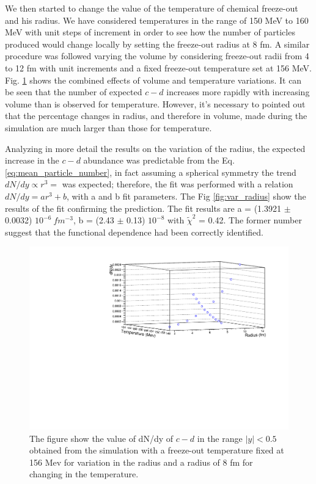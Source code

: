 \documentclass[12pt,a4paper]{book}
\begin{document}
	We then started to change the value of the temperature of chemical freeze-out and his radius. We have considered temperatures in the range of 150 MeV to 160 MeV with unit steps of increment in order to see how the number of particles produced would change locally by setting the freeze-out radius at 8 fm. A similar procedure was followed varying the volume by considering freeze-out radii from 4 to 12 fm with unit increments and a fixed freeze-out temperature set at 156 MeV. Fig. \ref{fig:2dgraph} shows the combined effects of volume and temperature variations. It can be seen that the number of expected $c-d$ increases more rapidly with increasing volume than is observed for temperature. However, it's necessary to pointed out that the percentage changes in radius, and therefore in volume, made during the simulation are much larger than those for temperature.
	
  Analyzing in more detail the results on the variation of the radius, the expected increase in the $c-d$ abundance  was predictable from the Eq. \ref{eq:mean_particle_number}, in fact assuming a spherical symmetry the trend $dN/dy \propto r^3 = $ was expected; therefore, the fit was performed with a relation $dN/dy =a r^3 +b$, with a and b fit parameters. The Fig \ref{fig:var_radius} show the results of the fit confirming the prediction. The fit results are  a = (1.3921 $\pm$ 0.0032) $10^{-6} \ fm^{-3}$, b = (2.43 $\pm$ 0.13) $10^{-8}$ with $\tilde{\chi}^2$ = 0.42. The former number suggest that the functional dependence had been correctly identified.   
	\begin{figure}
		\centering
			\includegraphics[width=0.7 \linewidth]{pictures/2dgraph.pdf}
		\caption{The figure show the value of dN/dy of $c-d$ in the range $|y|<0.5$ obtained from the simulation with a freeze-out temperature fixed at 156 Mev for variation in the radius and a radius of 8 fm for changing in the temperature.}
		\label{fig:2dgraph}
	\end{figure}
	
\end{document}
